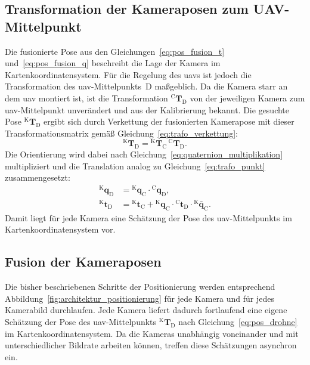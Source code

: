 \subsection*{Transformation der Kameraposen zum UAV-Mittelpunkt}
\label{subsec:pos_drohnenmittelpunkt}
Die fusionierte Pose aus den Gleichungen~\ref{eq:pos_fusion_t} und~\ref{eq:pos_fusion_q} beschreibt die Lage der Kamera im Kartenkoordinatensystem.
Für die Regelung des \gls{uav}s ist jedoch die Transformation des \gls{uav}-Mittelpunkts~$\mathrm{D}$ maßgeblich.
Da die Kamera starr an dem \gls{uav} montiert ist, ist die Transformation $^{\mathrm{C}}\mathbf{T}_{\mathrm{D}}$ 
von der jeweiligen Kamera zum \gls{uav}-Mittelpunkt unverändert und aus der Kalibrierung bekannt.
Die gesuchte Pose $^{\mathrm{K}}\mathbf{T}_{\mathrm{D}}$ ergibt sich durch Verkettung der fusionierten 
Kamerapose mit dieser Transformationsmatrix gemäß Gleichung~\ref{eq:trafo_verkettung}:
\begin{equation}
^{\mathrm{K}}\mathbf{T}_{\mathrm{D}} = {^{\mathrm{K}}\mathbf{T}_{\mathrm{C}}}\,{^{\mathrm{C}}\mathbf{T}_{\mathrm{D}}}.
\label{eq:pos_drohne}
\end{equation}
Die Orientierung wird dabei nach Gleichung~\ref{eq:quaternion_multiplikation} multipliziert und die Translation analog zu Gleichung~\ref{eq:trafo_punkt} zusammengesetzt:
\begin{align}
^{\mathrm{K}}\mathbf{q}_{\mathrm{D}} &= {^{\mathrm{K}}\mathbf{q}_{\mathrm{C}}} \cdot {^{\mathrm{C}}\mathbf{q}_{\mathrm{D}}}, \label{eq:pos_drohne_q}\\
^{\mathrm{K}}\mathbf{t}_{\mathrm{D}} &= {^{\mathrm{K}}\mathbf{t}_{\mathrm{C}}} + {^{\mathrm{K}}\mathbf{q}_{\mathrm{C}}} \cdot {^{\mathrm{C}}\mathbf{t}_{\mathrm{D}}} \cdot {^{\mathrm{K}}\bar{\mathbf{q}}_{\mathrm{C}}}.
\label{eq:pos_drohne_t}
\end{align}
Damit liegt für jede Kamera eine Schätzung der Pose des \gls{uav}-Mittelpunkts im Kartenkoordinatensystem vor.


\subsection*{Fusion der Kameraposen}
\label{subsec:pos_kamerafusion}
Die bisher beschriebenen Schritte der Posi\-tionierung werden entsprechend Abbildung~\ref{fig:architektur_positionierung} für jede Kamera und für jedes Kamerabild durchlaufen.
Jede Kamera liefert dadurch fortlaufend eine eigene Schätzung der Pose des \gls{uav}-Mittelpunkts $^{\mathrm{K}}\mathbf{T}_{\mathrm{D}}$ 
nach Gleichung~\ref{eq:pos_drohne} im Kartenkoordinatensystem.
Da die Kameras unabhängig voneinander und mit unterschiedlicher Bildrate arbeiten können, treffen diese Schätzungen asynchron ein.


